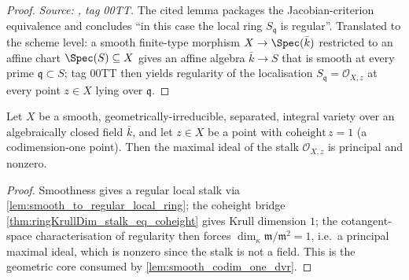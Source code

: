 \begin{proof}
  \textit{Source: \cite{stacks-project}, tag 00TT.} The cited lemma packages the
  Jacobian-criterion equivalence and concludes ``in this case the local ring
  \(S_{\mathfrak q}\) is regular''. Translated to the scheme level: a smooth
  finite-type morphism \(X \to \Spec(\bar k)\) restricted to an affine chart
  \(\Spec(S) \subseteq X\) gives an affine algebra \(\bar k \to S\) that is
  smooth at every prime \(\mathfrak q \subset S\); tag 00TT then yields
  regularity of the localisation \(S_{\mathfrak q} = \mathcal O_{X, z}\) at every
  point \(z \in X\) lying over \(\mathfrak q\).
\end{proof}

\begin{lemma}\leanok
  \label{lem:smooth_codim_one_maximalIdeal_principal}
  Let \(X\) be a smooth, geometrically-irreducible, separated, integral variety over an
  algebraically closed field \(\bar k\), and let \(z \in X\) be a point with
  \(\mathrm{coheight}\,z = 1\) (a codimension-one point). Then the maximal ideal of the
  stalk \(\mathcal O_{X,z}\) is principal and nonzero.
\end{lemma}

\begin{proof}
  Smoothness gives a regular local stalk via
  \cref{lem:smooth_to_regular_local_ring}; the coheight bridge
  \cref{thm:ringKrullDim_stalk_eq_coheight} gives Krull dimension \(1\); the
  cotangent-space characterisation of regularity then forces
  \(\dim_\kappa \mathfrak m/\mathfrak m^2 = 1\), i.e.\ a principal maximal ideal, which
  is nonzero since the stalk is not a field. This is the geometric core consumed by
  \cref{lem:smooth_codim_one_dvr}.
\end{proof}

